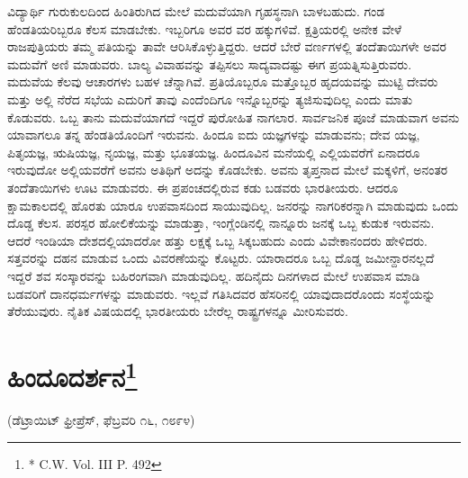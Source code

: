 ವಿದ್ಯಾರ್ಥಿ ಗುರುಕುಲದಿಂದ ಹಿಂತಿರುಗಿದ ಮೇಲೆ ಮದುವೆಯಾಗಿ ಗೃಹಸ್ಥನಾಗಿ ಬಾಳಬಹುದು. ಗಂಡ ಹೆಂಡತಿಯರಿಬ್ಬರೂ ಕೆಲಸ ಮಾಡಬೇಕು. ಇಬ್ಬರಿಗೂ ಅವರ ವರ ಹಕ್ಕುಗಳಿವೆ. ಕ್ಷತ್ರಿಯರಲ್ಲಿ ಅನೇಕ ವೇಳೆ ರಾಜಪುತ್ರಿಯರು ತಮ್ಮ ಪತಿಯನ್ನು ತಾವೇ ಆರಿಸಿಕೊಳ್ಳುತ್ತಿದ್ದರು. ಆದರೆ ಬೇರೆ ವರ್ಣಗಳಲ್ಲಿ ತಂದೆತಾಯಿಗಳೇ ಅವರ ಮದುವೆಗೆ ಅಣಿ ಮಾಡುವರು. ಬಾಲ್ಯ ವಿವಾಹವನ್ನು ತಪ್ಪಿಸಲು ಸಾದ್ಯವಾದಷ್ಟು ಈಗ ಪ್ರಯತ್ನಿಸುತ್ತಿರುವರು. ಮದುವೆಯ ಕೆಲವು ಆಚಾರಗಳು ಬಹಳ ಚೆನ್ನಾಗಿವೆ. ಪ್ರತಿಯೊಬ್ಬರೂ ಮತ್ತೊಬ್ಬರ ಹೃದಯವನ್ನು ಮುಟ್ಟಿ ದೇವರು ಮತ್ತು ಅಲ್ಲಿ ನೆರೆದ ಸಭೆಯ ಎದುರಿಗೆ ತಾವು ಎಂದೆಂದಿಗೂ ಇನ್ನೊಬ್ಬರನ್ನು ತ್ಯಜಿಸುವುದಿಲ್ಲ ಎಂದು ಮಾತು ಕೊಡುವರು. ಒಬ್ಬ ತಾನು ಮದುವೆಯಾಗದೆ ಇದ್ದರೆ ಪುರೋಹಿತ ನಾಗಲಾರ. ಸಾರ್ವಜನಿಕ ಪೂಜೆ ಮಾಡುವಾಗ ಅವನು ಯಾವಾಗಲೂ ತನ್ನ ಹೆಂಡತಿಯೊಂದಿಗೆ ಇರುವನು. ಹಿಂದೂ ಐದು ಯಜ್ಞಗಳನ್ನು ಮಾಡುವನು; ದೇವ ಯಜ್ಞ, ಪಿತೃಯಜ್ಞ, ಋಷಿಯಜ್ಞ, ನೃಯಜ್ಞ, ಮತ್ತು ಭೂತಯಜ್ಞ. ಹಿಂದೂವಿನ ಮನೆಯಲ್ಲಿ ಎಲ್ಲಿಯವರೆಗೆ ಏನಾದರೂ ಇರುವುದೋ ಅಲ್ಲಿಯವರೆಗೆ ಅವನು ಅತಿಥಿಗೆ ಅದನ್ನು ಕೊಡಬೇಕು. ಅವನು ತೃಪ್ತನಾದ ಮೇಲೆ ಮಕ್ಕಳಿಗೆ, ಅನಂತರ ತಂದೆತಾಯಿಗಳು ಊಟ ಮಾಡುವರು. ಈ ಪ್ರಪಂಚದಲ್ಲಿರುವ ಕಡು ಬಡವರು ಭಾರತೀಯರು. ಆದರೂ ಕ್ಷಾಮಕಾಲದಲ್ಲಿ ಹೊರತು ಯಾರೂ ಉಪವಾಸದಿಂದ ಸಾಯುವುದಿಲ್ಲ. ಜನರನ್ನು ನಾಗರಿಕರನ್ನಾಗಿ ಮಾಡುವುದು ಒಂದು ದೊಡ್ಡ ಕೆಲಸ. ಪರಸ್ಪರ ಹೋಲಿಕೆಯನ್ನು ಮಾಡುತ್ತಾ, ಇಂಗ್ಲೆಂಡಿನಲ್ಲಿ ನಾನ್ನೂರು ಜನಕ್ಕೆ ಒಬ್ಬ ಕುಡುಕ ಇರುವನು. ಆದರೆ ಇಂಡಿಯಾ ದೇಶದಲ್ಲಿಯಾದರೋ ಹತ್ತು ಲಕ್ಷಕ್ಕೆ ಒಬ್ಬ ಸಿಕ್ಕಬಹುದು ಎಂದು ವಿವೇಕಾನಂದರು ಹೇಳಿದರು. ಸತ್ತವರನ್ನು ದಹನ ಮಾಡುವ ಒಂದು ವಿವರಣೆಯನ್ನು ಕೊಟ್ಟರು. ಯಾರಾದರೂ ಒಬ್ಬ ದೊಡ್ಡ ಜಮೀನ್ದಾರನಲ್ಲದೆ ಇದ್ದರೆ ಶವ ಸಂಸ್ಕಾರವನ್ನು ಬಹಿರಂಗವಾಗಿ ಮಾಡುವುದಿಲ್ಲ. ಹದಿನೈದು ದಿನಗಳಾದ ಮೇಲೆ ಉಪವಾಸ ಮಾಡಿ ಬಡವರಿಗೆ ದಾನಧರ್ಮಗಳನ್ನು ಮಾಡುವರು. ಇಲ್ಲವೆ ಗತಿಸಿದವರ ಹೆಸರಿನಲ್ಲಿ ಯಾವುದಾದರೊಂದು ಸಂಸ್ಥೆಯನ್ನು ತೆರೆಯುವುರು. ನೈತಿಕ ವಿಷಯದಲ್ಲಿ ಭಾರತೀಯರು ಬೇರೆಲ್ಲ ರಾಷ್ಟ್ರಗಳನ್ನೂ ಮೀರಿಸುವರು.

\delimiter


\section[ಹಿಂದೂದರ್ಶನ]{ಹಿಂದೂದರ್ಶನ\protect\footnote{* C.W. Vol. III P. 492}}

\begin{center}
(ಡೆಟ್ರಾಯಿಟ್​ ಫ್ರೀಪ್ರೆಸ್​, ಫೆಬ್ರವರಿ ೧೬, ೧೮೯೪)
\end{center}

